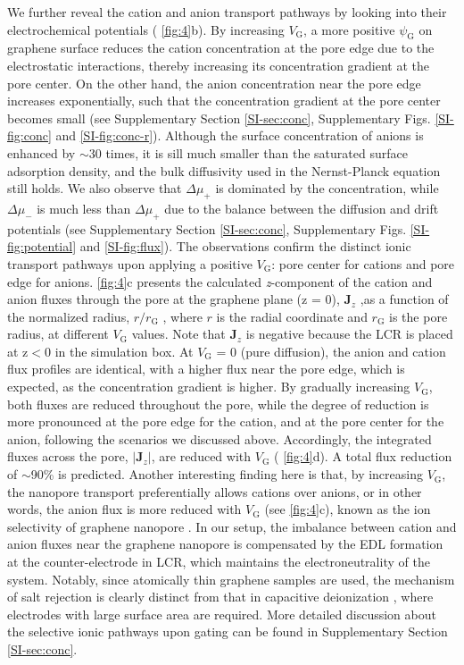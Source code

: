 We further reveal the cation and anion transport pathways by looking
into their electrochemical potentials (\Fig{} \ref{fig:4}b). By
increasing $V_{\mathrm{G}}$, a more positive $\psi_{\mathrm{G}}$ on
graphene surface reduces the cation concentration at the pore edge due
to the electrostatic interactions, thereby increasing its
concentration gradient at the pore center. On the other hand, the
anion concentration near the pore edge increases exponentially, such
that the concentration gradient at the pore center becomes small (see
{ Supplementary Section \ref{SI-sec:conc}, Supplementary
Figs. \ref{SI-fig:conc} and \ref{SI-fig:conc-r}}).
{
Although the surface
concentration of anions is enhanced by $\sim{}$30 times, it is sill
much smaller than the saturated surface adsorption density, and the
bulk diffusivity used in the Nernst-Planck equation still holds.  We
also observe that $\Delta \mu_{+}$ is dominated by the concentration,
while $\Delta \mu_{-}$ is much less than $\Delta \mu_{+}$ due to the
balance between the diffusion and drift potentials (see Supplementary
Section \ref{SI-sec:conc}, Supplementary Figs.  \ref{SI-fig:potential}
and \ref{SI-fig:flux})}. 
The observations confirm the distinct ionic
transport pathways upon applying a positive $V_{\mathrm{G}}$: pore
center for cations and pore edge for anions. \Fig{} \ref{fig:4}c
presents the calculated \textit{z}-component of the cation and anion
fluxes through the pore at the graphene plane (z = 0),
$\boldsymbol{J}_{z}$ ,as a function of the normalized radius,
$r/r_{\mathrm{G}}$ , where $r$ is the radial coordinate and
$r_{\mathrm{G}}$ is the pore radius, at different $V_{\mathrm{G}}$
values. Note that $\boldsymbol{J}_{z}$ is negative because the LCR is
placed at z$<$0 in the simulation box. At $V_{\mathrm{G}}$ = 0 (pure
diffusion), the anion and cation flux profiles are identical, with a
higher flux near the pore edge, which is expected, as the
concentration gradient is higher. By gradually increasing
$V_{\mathrm{G}}$, both fluxes are reduced throughout the pore, while
the degree of reduction is more pronounced at the pore edge for the
cation, and at the pore center for the anion, following the scenarios
we discussed above. Accordingly, the integrated fluxes across the
pore, $|\boldsymbol{J}_{z}|$, are reduced with $V_{\mathrm{G}}$
(\Fig{} \ref{fig:4}d). A total flux reduction of $\sim$90\% is
predicted. Another interesting finding here is that, by increasing
$V_{\mathrm{G}}$, the nanopore transport preferentially allows cations
over anions, or in other words, the anion flux is more reduced with
$V_{\mathrm{G}}$ (see \Fig{} \ref{fig:4}c), known as the ion
selectivity of graphene nanopore \cite{Rollings_2016}. In our setup,
the imbalance between cation and anion fluxes near the graphene
nanopore is compensated by the EDL formation at the counter-electrode
in LCR, which maintains the electroneutrality of the system. Notably,
since atomically thin graphene samples are used, the mechanism of salt
rejection is clearly distinct from that in capacitive deionization
\cite{Biesheuvel_2010}, where electrodes with large surface area are
required. 
{
More detailed discussion about the selective ionic pathways
upon gating can be found in Supplementary Section \ref{SI-sec:conc}.}


